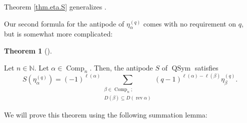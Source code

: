 \documentclass[numbers=enddot,12pt,final,onecolumn,notitlepage]{scrartcl}%
\theoremstyle{definition}
\newtheorem{theo}{Theorem}[section]
\newenvironment{theorem}[1][]
{\begin{theo}[#1]\begin{leftbar}}
{\end{leftbar}\end{theo}}
\let\sumnonlimits\sum
\renewcommand{\sum}{\sumnonlimits\limits}
\newenvironment{vershort}{}{}
\begin{document}
Theorem \ref{thm.eta.S} generalizes \cite[Proposition 2.9]{Hsiao07}.

Our second formula for the antipode of $\eta_{\alpha}^{\left(  q\right)  }$
comes with no requirement on $q$, but is somewhat more complicated:

\begin{theorem}
\label{thm.eta.S2}Let $n\in\mathbb{N}$. Let $\alpha\in\operatorname*{Comp}%
\nolimits_{n}$. Then, the antipode $S$ of $\operatorname*{QSym}$ satisfies
\[
S\left(  \eta_{\alpha}^{\left(  q\right)  }\right)  =\left(  -1\right)
^{\ell\left(  \alpha\right)  }\sum_{\substack{\beta\in\operatorname*{Comp}%
\nolimits_{n};\\D\left(  \beta\right)  \subseteq D\left(  \operatorname*{rev}%
\alpha\right)  }}\left(  q-1\right)  ^{\ell\left(  \alpha\right)  -\ell\left(
\beta\right)  }\eta_{\beta}^{\left(  q\right)  }.
\]

\end{theorem}

\begin{vershort}
We will prove this theorem using the following summation lemma:
\end{vershort}
\end{document}
